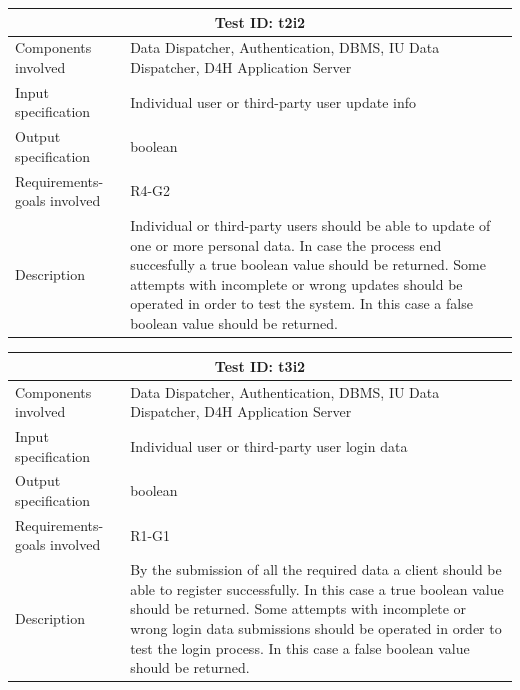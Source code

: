 \begin{table}[H]
\centering
\begin{tabular}{ |p{4.5cm}||p{11cm}|  }
 \hline
 \multicolumn{2}{|c|}{Test ID: t2i2} \\
 
 \hline 
 Components involved  	&   Data Dispatcher, Authentication, DBMS, IU Data Dispatcher, D4H Application Server \\
 Input specification  	&  	 Individual user or third-party user update info\\
Output specification  	& 	  boolean	\\
Requirements-goals involved &    R4-G2 \\
Description  	& 	 	    Individual or third-party users should be able to update of one or more personal data. In case the process end succesfully a true boolean value should be returned. Some attempts with incomplete or wrong updates should be operated in order to test the system. In this case a false boolean value should be returned.\\
 \hline
\end{tabular}
\end{table}
\begin{table}[H]
\centering
\begin{tabular}{ |p{4.5cm}||p{11cm}|  }
 \hline
 \multicolumn{2}{|c|}{Test ID: t3i2} \\
 
 \hline 
 Components involved  	&  Data Dispatcher, Authentication, DBMS, IU Data Dispatcher, D4H Application Server \\
 Input specification  	&  	 Individual user or third-party user login data\\
Output specification  	& 	  	boolean\\
Requirements-goals involved &    R1-G1\\
Description  	& 	 	 By the submission of all the required data a client should be able to register successfully. In this case a true boolean value should be returned. Some attempts with incomplete or wrong login data submissions should be operated in order to test the login process. In this case a false boolean value should be returned.   \\
 \hline
\end{tabular}
\end{table}

